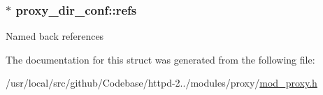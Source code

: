 \subsubsection[{\texorpdfstring{refs}{refs}}]{$\ast$ proxy\+\_\+dir\+\_\+conf\+::refs}\hypertarget{structproxy__dir__conf_a4bbe4a2bdb6f8c42b64dd98e29302254}{}\label{structproxy__dir__conf_a4bbe4a2bdb6f8c42b64dd98e29302254}
Named back references 

The documentation for this struct was generated from the following file\+:\begin{DoxyCompactItemize}
\item 
/usr/local/src/github/\+Codebase/httpd-\/2../modules/proxy/\hyperlink{mod__proxy_8h}{mod\+\_\+proxy.\+h}\end{DoxyCompactItemize}
